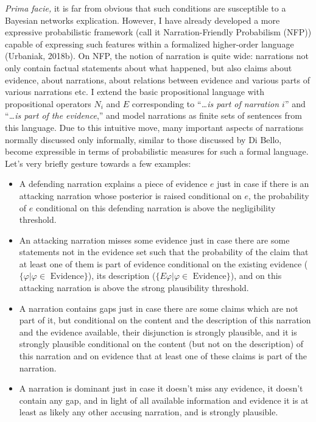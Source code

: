 \documentclass[11pt,dvipsnames,enabledeprecatedfontcommands]{scrartcl}
\begin{document}
\vspace{2mm}

\emph{Prima facie,} it is far from obvious that such conditions are
susceptible to a Bayesian networks explication. However, I have already
developed a more expressive probabilistic framework (call it
Narration-Friendly Probabilism (NFP)) capable of expressing such
features within a formalized higher-order language (Urbaniak, 2018b). On
NFP, the notion of narration is quite wide: narrations not only contain
factual statements about what happened, but also claims about evidence,
about narrations, about relations between evidence and various parts of
various narrations etc. I extend the basic propositional language with
propositional operators \(N_i\) and \(E\) corresponding to
``\emph{\dots is part of narration $i$}'' and
``\emph{\dots is part of the evidence},'' and model narrations as finite
sets of sentences from this language. Due to this intuitive move, many
important aspects of narrations normally discussed only informally,
similar to those discussed by Di Bello, become expressible in terms of
probabilistic measures for such a formal language. Let's very briefly
gesture towards a few examples:

\begin{itemize}\setlength\itemsep{-1.5mm}
 \item A defending narration explains  a piece of evidence  $e$ just in case  if there is an  attacking narration whose posterior is raised conditional on $e$, the probability of $e$ conditional on this defending narration is above the negligibility threshold.
 \item An attacking narration misses some evidence just in case there are some statements not in the evidence set such that the probability of the claim that at least one of them is part of evidence conditional on the existing evidence ($\{\varphi\vert \varphi \in \mbox{ Evidence}\}$), its description ($\{E\varphi\vert \varphi \in \mbox{ Evidence}\}$), and on this attacking narration is above the strong plausibility threshold. 
 \item A narration contains gaps just in case there are some claims which are not part of it, but conditional on the content and the description of this narration and the evidence available, their disjunction is strongly plausible, and it is strongly plausible conditional on the content (but not on the description) of this narration and on evidence that at least one of these claims is part of the narration.
 \item  A narration is dominant just in case it doesn't miss any evidence, it doesn’t contain any gap, and in light of all available information and evidence it is at least as likely any other accusing narration, and is strongly plausible.
 \end{itemize}
\end{document}
